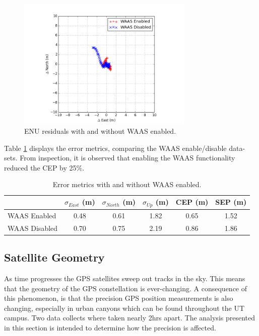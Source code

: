 \documentclass[11pt]{article}
\begin{document}
\begin{figure}[h]
\begin{center}
\includegraphics[width=0.75\textwidth]{ENU-residual-WAAS.png}
\end{center}
\caption{ENU residuals with and without WAAS enabled.}
\label{fig:WAAS}
\end{figure}


Table \ref{tab:WAAS} displays the error metrics, comparing the WAAS enable/disable data-sets. From inspection, it is observed that enabling the WAAS functionality reduced the CEP by 25\%.

\begin{table}[h!]
\begin{center}
    \begin{tabular}{  l || c | c | c | c | c | }
 & $\sigma_{East}$ (m) & $\sigma_{North}$ (m) & $\sigma_{Up}$ (m) & CEP (m) & SEP (m) \\\hline\hline
WAAS Enabled    &  0.48  & 0.61 &  1.82 & 0.65 & 1.52 \\\hline
WAAS Disabled   &  0.70  & 0.75 &  2.19 & 0.86 & 1.86 \\\hline
    \end{tabular}
\caption{Error metrics with and without WAAS enabled.}
\label{tab:WAAS}
\end{center}
\end{table}

 

\subsection{Satellite Geometry}

As time progresses the GPS satellites sweep out tracks in the sky. This means that the geometry of the GPS constellation is ever-changing. A consequence of this phenomenon, is that the precision GPS position measurements is also changing, especially in urban canyons which can be found throughout the UT campus. Two data collects where taken nearly 2hrs apart. The analysis presented in this section is intended to determine how the precision is affected.
\end{document}
